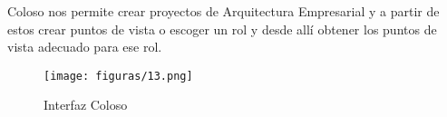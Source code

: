 Coloso nos permite crear proyectos de Arquitectura Empresarial y a partir de estos crear
puntos de vista o escoger un rol y desde allí obtener los puntos de vista adecuado para
ese rol.
  \begin{figure}[!h]
   	\centering
   	\texttt{[image: figuras/13.png]}
   	\captionsetup{width=.95\textwidth}
   	\caption{Interfaz Coloso}
   	\label{figura13}
  \end{figure}